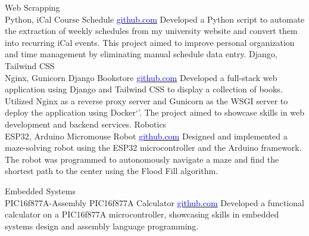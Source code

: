 \documentclass[9pt]{developercv} %
\begin{document}
\begin{entrylist}
    \entry
		{Web Scrapping \\ Python, iCal}
		{Course Schedule}
		{\href{https://github.com/mabushelbaia/Course-Schedule}{\textcolor{blue}{github.com}}}
		{Developed a Python script to automate the extraction of weekly schedules from my university website and convert them into recurring iCal events. This project aimed to improve personal organization and time management by eliminating manual schedule data entry.}
    \entry
        {Django, Tailwind CSS \\ Nginx, Gunicorn}
        {Django Bookstore}
        {\href{https://github.com/mabushelbaia/django-bookstore}{\textcolor{blue}{github.com}}}
        {Developed a full-stack web application using Django and Tailwind CSS to display a collection of books. Utilized Nginx as a reverse proxy server and Gunicorn as the WSGI server to deploy the application using Docker`'. The project aimed to showcase skills in web development and backend services.}
    \entry
        {Robotics\\ ESP32, Arduino}
        {Micromouse Robot}
        {\href{https://github.com/mabushelbaia/Micromouse}{\textcolor{blue}{github.com}}}
        {Designed and implemented a maze-solving robot using the ESP32 microcontroller and the Arduino framework. The robot was programmed to autonomously navigate a maze and find the shortest path to the center using the Flood Fill algorithm.}
        
	\entry
		{Embedded Systems\\ PIC16f877A-Assembly}
		{PIC16f877A Calculator}
		{\href{https://github.com/mabushelbaia/PIC16F877A-Calculator}{\textcolor{blue}{github.com}}}
		{Developed a functional calculator on a PIC16f877A microcontroller, showcasing skills in embedded systems design and assembly language programming.}


\end{entrylist}
\end{document}
